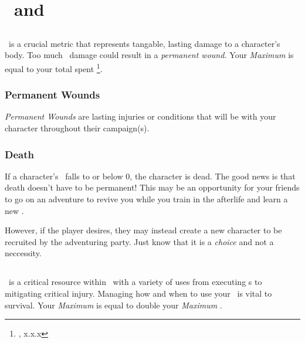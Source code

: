 
\chapter{\HPful\ and \ENful}

\section{\HPful\index{\HPful}}

\HPful\ is a crucial metric that represents tangable, lasting damage
to a character's body. Too much \HPful\ damage could result in a
\textit{permanent wound.} Your \emph{Maximum \HPful} is equal to your total spent \attrval\footnote{\attrval, x.x.x}.


\subsection{Permanent Wounds}
\emph{Permanent Wounds} are lasting injuries or conditions that will be with your character throughout their campaign(s).

\subsection{Death}

If a character's \HPful\ falls to or below 0, the character is dead. The good news is that death doesn't have to be permanent!
This may be an opportunity for your friends to go on an adventure
to revive you while you train in the afterlife and learn a new \techn .

However, if the player desires, they may instead create a new character
to be recruited by the adventuring party. Just know that it is a \emph{choice}
and not a neccessity.

\section{\ENful\index{\ENful}}

\ENful\ is a critical resource within \gametitlemini\ with a variety
of uses from executing \techn s  to mitigating critical injury.
Managing how and when to use your \ENful\ is vital to survival. Your \emph{Maximum \ENful} is equal to double your \emph{Maximum \HPful}.

